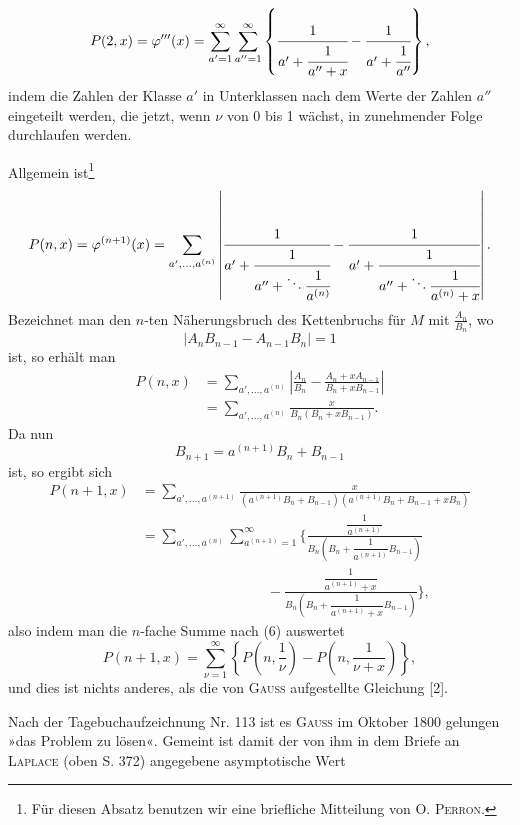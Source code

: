 \clearpage{}
\par\begingroup\small
\makeatletter\tagsleft@true\let\veqno\@@leqno\makeatother
\renewcommand{\thefootnote}{*)}
\[
P(2,x)=\varphi'''(x)=\sum_{a'=1}^{\infty}\sum_{a''=1}^{\infty}\left\{\cfrac1{a'+\cfrac1{a''+x}}-\cfrac1{a'+\cfrac1{a''}}\right\},
\]
\noindent indem die Zahlen der Klasse \(a'\) in Unterklassen nach dem Werte der Zahlen \(a''\) eingeteilt werden, die jetzt, wenn \(\nu\) von 0 bis 1 wächst, in zunehmender Folge durchlaufen werden.
\par\noindent\hspace*{\parindent}Allgemein ist\footnote{Für diesen Absatz benutzen wir eine briefliche Mitteilung von \textsc{O. Perron}.}
\[
P(n,x)=\varphi^{(n+1)}(x)=\sum_{a',\ldots,a^{(n)}}\left|\cfrac1{a'+\cfrac1{a''+\ddots\cfrac1{a^{(n)}}}}-\cfrac1{a'+\cfrac1{a''+\ddots\cfrac1{a^{(n)}+x}}}\right|.
\]
\noindent Bezeichnet man den \(n\)-ten Näherungsbruch des Kettenbruchs für \(M\) mit \(\frac{A_n}{B_n}\), wo
\[
|A_nB_{n-1}-A_{n-1}B_n|=1
\]
\noindent ist, so erhält man
\begin{equation*}\tag*{(6)}
\begin{aligned}
P(n,x)&=\sum_{a',\ldots,a^{(n)}}\left|\frac{A_n}{B_n}-\frac{A_n+xA_{n-1}}{B_n+xB_{n-1}}\right|\\
&=\sum_{a',\ldots,a^{(n)}}\frac{x}{B_n(B_n+xB_{n-1})}.
\end{aligned}
\end{equation*}
\noindent Da nun
\[
B_{n+1}=a^{(n+1)}B_n+B_{n-1}
\]
\noindent ist, so ergibt sich
\[
\begin{aligned}
P(n+1,x)&=\sum_{a',\ldots,a^{(n+1)}}\frac{x}{(a^{(n+1)}B_n+B_{n-1})(a^{(n+1)}B_n+B_{n-1}+xB_n)}\\[1ex]
&=\sum_{a',\ldots,a^{(n)}}\sum_{a^{(n+1)}=1}^{\infty}\Biggl\{\frac{\dfrac1{a^{(n+1)}}}{B_n\left(B_n+\dfrac1{a^{(n+1)}}B_{n-1}\right)}\\[1ex]
&\hspace{9em}-\frac{\dfrac1{a^{(n+1)}+x}}{B_n\left(B_n+\dfrac1{a^{(n+1)}+x}B_{n-1}\right)}\Biggr\},
\end{aligned}
\]
\noindent also indem man die \(n\)-fache Summe nach (6) auswertet
\begin{equation*}\tag*{(7)}P(n+1,x)=\sum_{\nu=1}^{\infty}\left\{P\left(n,\frac1\nu\right)-P\left(n,\frac1{\nu+x}\right)\right\},\end{equation*}
\noindent und dies ist nichts anderes, als die von \textsc{Gauss} aufgestellte Gleichung [2].
\par\noindent\hspace*{\parindent}Nach der Tagebuchaufzeichnung Nr. 113 ist es \textsc{Gauss} im Oktober 1800 gelungen »das Problem zu lösen«. Gemeint ist damit der von ihm in dem Briefe an \textsc{Laplace} (oben S. 372) angegebene asymptotische Wert
